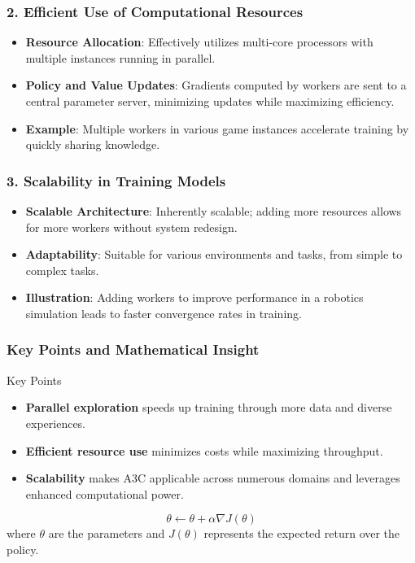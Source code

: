 \documentclass{beamer}
\begin{document}
\begin{frame}[fragile]
    \frametitle{2. Efficient Use of Computational Resources}
    \begin{itemize}
        \item \textbf{Resource Allocation}: Effectively utilizes multi-core processors with multiple instances running in parallel.
        \item \textbf{Policy and Value Updates}: Gradients computed by workers are sent to a central parameter server, minimizing updates while maximizing efficiency.
        \item \textbf{Example}: Multiple workers in various game instances accelerate training by quickly sharing knowledge.
    \end{itemize}
\end{frame}

\begin{frame}[fragile]
    \frametitle{3. Scalability in Training Models}
    \begin{itemize}
        \item \textbf{Scalable Architecture}: Inherently scalable; adding more resources allows for more workers without system redesign.
        \item \textbf{Adaptability}: Suitable for various environments and tasks, from simple to complex tasks.
        \item \textbf{Illustration}: Adding workers to improve performance in a robotics simulation leads to faster convergence rates in training.
    \end{itemize}
\end{frame}

\begin{frame}[fragile]
    \frametitle{Key Points and Mathematical Insight}
    \begin{block}{Key Points}
        \begin{itemize}
            \item \textbf{Parallel exploration} speeds up training through more data and diverse experiences.
            \item \textbf{Efficient resource use} minimizes costs while maximizing throughput.
            \item \textbf{Scalability} makes A3C applicable across numerous domains and leverages enhanced computational power.
        \end{itemize}
    \end{block}

    \begin{equation}
        \theta \leftarrow \theta + \alpha \nabla J(\theta)
    \end{equation}
    where \( \theta \) are the parameters and \( J(\theta) \) represents the expected return over the policy.
\end{frame}
\end{document}
